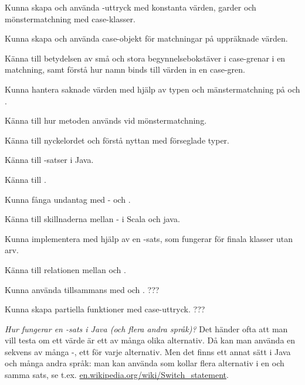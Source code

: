 

\Exercise{\ExeWeekEIGHT}\label{exe:W08}

\begin{Goals}
\item Kunna skapa och använda -uttryck med konstanta värden, garder och mönstermatchning med case-klasser.
\item Kunna skapa och använda case-objekt för matchningar på uppräknade värden.
\item Känna till betydelsen av små och stora begynnelsebokstäver i case-grenar i en matchning, samt förstå hur namn binds till värden in en case-gren.
\item Kunna hantera saknade värden med hjälp av typen  och mänstermatchning på  och . 
\item Känna till hur metoden  används vid mönstermatchning.
\item Känna till nyckelordet  och förstå nyttan med förseglade typer.
\item Känna till -satser i Java.
\item Känna till .
\item Kunna fånga undantag med - och .
\item Känna till skillnaderna mellan - i Scala och java.
\item Kunna implementera  med hjälp av en -sats, som fungerar för finala klasser utan arv.
\item Känna till relationen mellan  och .
\item Kunna använda  tillsammans med  och . ???
\item Kunna skapa partiella funktioner med case-uttryck. ???
\end{Goals}

\begin{Preparations}
\item {} 
\end{Preparations}

\BasicTasks %

\Task \label{task:switch} \emph{Hur fungerar en -sats i Java (och flera andra språk)?} Det händer ofta att man vill testa om ett värde är ett av många olika alternativ. Då kan man använda en sekvens av många -, ett för varje alternativ. Men det finns ett annat sätt i Java och många andra språk: man kan använda  som kollar flera alternativ i en och samma sats, se t.ex. \href{https://en.wikipedia.org/wiki/Switch_statement}{en.wikipedia.org/wiki/Switch\_statement}.

